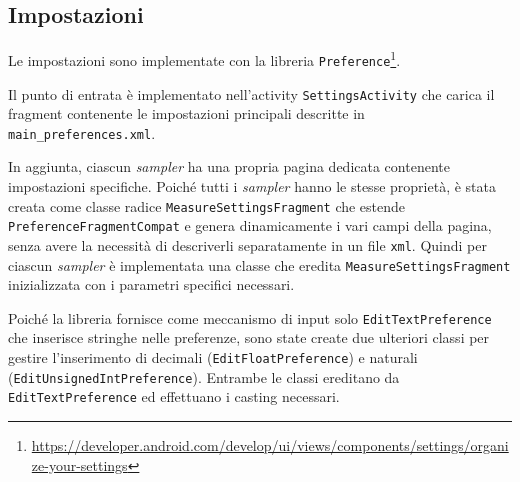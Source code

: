 
\subsection{Impostazioni}
Le impostazioni sono implementate con la libreria \texttt{Preference}\footnote{\url{https://developer.android.com/develop/ui/views/components/settings/organize-your-settings}}.

Il punto di entrata è implementato nell'activity \texttt{SettingsActivity} che carica il fragment contenente le impostazioni principali descritte in \texttt{main\_preferences.xml}. 

In aggiunta, ciascun \textit{sampler} ha una propria pagina dedicata contenente impostazioni specifiche.
Poiché tutti i \textit{sampler} hanno le stesse proprietà, è stata creata come classe radice \texttt{MeasureSettingsFragment} che estende \texttt{PreferenceFragmentCompat} e genera dinamicamente i vari campi della pagina, senza avere la necessità di descriverli separatamente in un file \texttt{xml}. 
Quindi per ciascun \textit{sampler} è implementata una classe che eredita \texttt{MeasureSettingsFragment} inizializzata con i parametri specifici necessari.

Poiché la libreria fornisce come meccanismo di input solo \texttt{EditTextPreference} che inserisce stringhe nelle preferenze, sono state create due ulteriori classi per gestire l'inserimento di decimali (\texttt{EditFloatPreference}) e naturali (\texttt{EditUnsignedIntPreference}). Entrambe le classi ereditano da \texttt{EditTextPreference} ed effettuano i casting necessari.